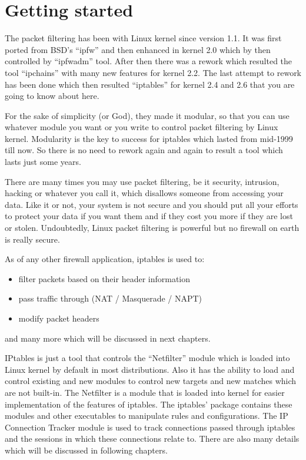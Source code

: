 \chapter{Getting started}
The packet filtering has been with Linux kernel since version 1.1. It was first ported from BSD's “ipfw” and then enhanced in kernel 2.0 which by then controlled by “ipfwadm” tool. After then there was a rework which resulted the tool “ipchains” with many new features for kernel 2.2. The last attempt to rework has been done which then resulted “iptables” for kernel 2.4 and 2.6 that you are going to know about here.\newline

For the sake of simplicity (or God), they made it modular, so that you can use whatever module you want or you write to control packet filtering by Linux kernel. Modularity is the key to success for iptables which lasted from mid-1999 till now. So there is no need to rework again and again to result a tool which lasts just some years.\newline

There are many times you may use packet filtering, be it security, intrusion, hacking or whatever you call it, which disallows someone from accessing your data. Like it or not, your system is not secure and you should put all your efforts to protect your data if you want them and if they cost you more if they are lost or stolen. Undoubtedly, Linux packet filtering is powerful but no firewall on earth is really secure.\newline

As of any other firewall application, iptables is used to:
\begin{itemize}
\item filter packets based on their header information
\item pass traffic through (NAT / Masquerade / NAPT)
\item modify packet headers
\end{itemize}
and many more which will be discussed in next chapters.\newline

IPtables is just a tool that controls the “Netfilter” module which is loaded into Linux kernel by default in most distributions. Also it has the ability to load and control existing and new modules to control new targets and new matches which are not built-in. The Netfilter is a module that is loaded into kernel for easier implementation of the features of iptables. The iptables' package contains these modules and other executables to manipulate rules and configurations. The IP Connection Tracker module is used to track connections passed through iptables and the sessions in which these connections relate to. There are also many details which will be discussed in following chapters.\newline

